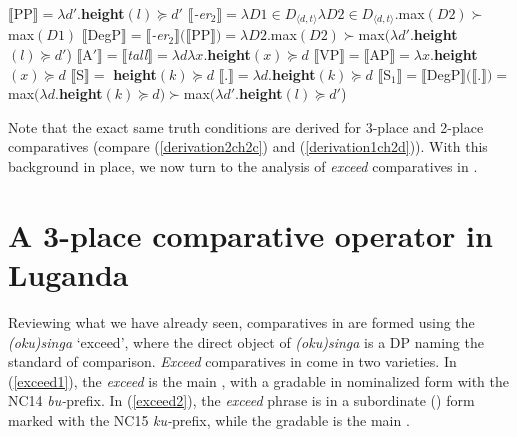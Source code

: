 \documentclass[output=paper,
modfonts
]{langscibook}
\begin{document}

\begin{exe}
\ex\label{derivation1ch2}
\begin{xlist}
\ex\label{derivation1ch2b}
 $\llbracket$PP$\rrbracket = \lambda d'.${\bf height}$(l) \succeq d'$
\ex
$\llbracket${\it-er$_2$}$\rrbracket = \lambda D1 \in D_{\langle d, t\rangle}\lambda D2\in D_{\langle d, t\rangle}.$max$(D2) \succ $ max$(D1)$
\ex $\llbracket$DegP$\rrbracket = \llbracket${\it-er}$_2$$\rrbracket(\llbracket$PP$\rrbracket) = \lambda D2.$max$(D2) \succ $max$(\lambda d'.${\bf height}$(l) \succeq d'$)
\ex
$\llbracket$A$'\rrbracket = \llbracket${\it tall}$\rrbracket = \lambda d\lambda x.${\bf height}$(x) \succeq d$
\ex
$\llbracket$VP$\rrbracket = \llbracket$AP$\rrbracket = \lambda x.${\bf height}$(x) \succeq d$
\ex
$\llbracket$S$\rrbracket = $ {\bf height}$(k) \succeq d$
\ex 
$\llbracket$.$\rrbracket = \lambda d.${\bf height}$(k) \succeq d$
\ex\label{derivation1ch2d} 
$\llbracket$S$_1\rrbracket = \llbracket$DegP$\rrbracket(\llbracket$.$\rrbracket) = $ max$(\lambda d.${\bf height}$(k) \succeq d) \succ $max$(\lambda d'.${\bf height}$(l) \succeq d'$)
\end{xlist}

\end{exe}



Note that the exact same truth conditions are derived for 3-place and 2-place comparatives (compare (\ref{derivation2ch2c}) and (\ref{derivation1ch2d})). With this background in place, we now turn to the analysis of {\it exceed} comparatives in .







\section{A 3-place comparative operator in Luganda}\label{sec3}


Reviewing what we have already seen, comparatives in  are formed using the  {\it (oku)singa} `exceed', where the direct object of {\it(oku)singa} is a DP naming the standard of comparison. {\it Exceed} comparatives in  come in two varieties. In (\ref{exceed1}), the {\it exceed}  is the main , with a gradable  in nominalized form with the NC14 {\it bu-}prefix. In (\ref{exceed2}), the {\it exceed}  phrase is in a subordinate () form marked with the NC15 {\it ku-}prefix, while the gradable  is the main .
\end{document}
